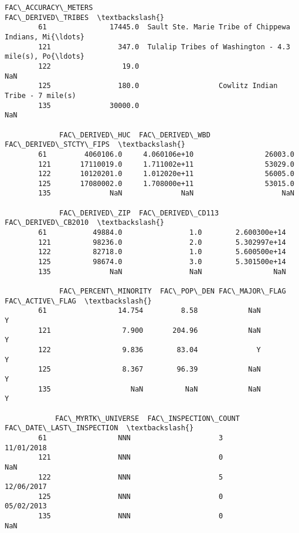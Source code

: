 \documentclass[11pt]{article}
\begin{document}
\begin{Verbatim}[commandchars=\\\{\}]
             FAC\_ACCURACY\_METERS                                 FAC\_DERIVED\_TRIBES  \textbackslash{}
        61               17445.0  Sault Ste. Marie Tribe of Chippewa Indians, Mi{\ldots}   
        121                347.0  Tulalip Tribes of Washington - 4.3 mile(s), Po{\ldots}   
        122                 19.0                                                NaN   
        125                180.0                   Cowlitz Indian Tribe - 7 mile(s)   
        135              30000.0                                                NaN   
        
             FAC\_DERIVED\_HUC  FAC\_DERIVED\_WBD  FAC\_DERIVED\_STCTY\_FIPS  \textbackslash{}
        61         4060106.0     4.060106e+10                 26003.0   
        121       17110019.0     1.711002e+11                 53029.0   
        122       10120201.0     1.012020e+11                 56005.0   
        125       17080002.0     1.708000e+11                 53015.0   
        135              NaN              NaN                     NaN   
        
             FAC\_DERIVED\_ZIP  FAC\_DERIVED\_CD113  FAC\_DERIVED\_CB2010  \textbackslash{}
        61           49884.0                1.0        2.600300e+14   
        121          98236.0                2.0        5.302997e+14   
        122          82718.0                1.0        5.600500e+14   
        125          98674.0                3.0        5.301500e+14   
        135              NaN                NaN                 NaN   
        
             FAC\_PERCENT\_MINORITY  FAC\_POP\_DEN FAC\_MAJOR\_FLAG FAC\_ACTIVE\_FLAG  \textbackslash{}
        61                 14.754         8.58            NaN               Y   
        121                 7.900       204.96            NaN               Y   
        122                 9.836        83.04              Y               Y   
        125                 8.367        96.39            NaN               Y   
        135                   NaN          NaN            NaN               Y   
        
            FAC\_MYRTK\_UNIVERSE  FAC\_INSPECTION\_COUNT FAC\_DATE\_LAST\_INSPECTION  \textbackslash{}
        61                 NNN                     3               11/01/2018   
        121                NNN                     0                      NaN   
        122                NNN                     5               12/06/2017   
        125                NNN                     0               05/02/2013   
        135                NNN                     0                      NaN   
        

\end{Verbatim}
\end{document}
